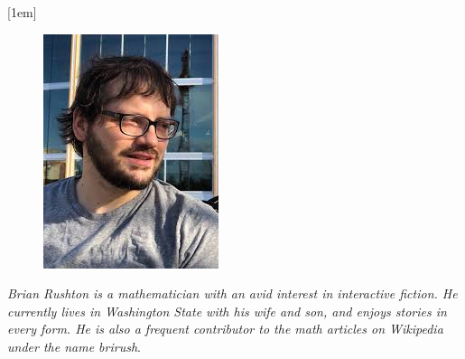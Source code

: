 \bigskip
{}[1em]
\begin{figure}
  \vspace{-3em}
  \begin{center}
  \includegraphics[width=\linewidth]{./media/images/brian}%
  \label{fig:brian}%
  \end{center}
\end{figure}                                                                
\noindent\emph{Brian Rushton is a mathematician with an avid interest in interactive fiction.
He currently lives in Washington State with his wife and son, and enjoys stories in every
form. He is also a frequent contributor to the math articles on Wikipedia under
the name \emph{brirush}}.
